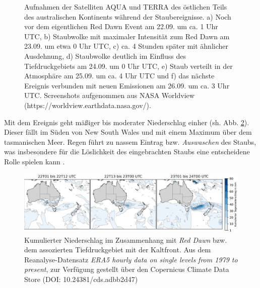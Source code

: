 \documentclass[12pt,a4paper,onecolumn,draft]{scrartcl}
\begin{document}
\begin{figure}[ht]
\begin{minipage}[c]{0.32\textwidth}
	\end{minipage}\hfill
\caption{Aufnahmen der Satelliten AQUA und TERRA des östlichen Teils des australischen Kontinents während der Staubereignisse. a) Noch vor dem eigentlichen Red Dawn Event am 22.09. um ca. 1 Uhr UTC, b) Staubwolke mit maximaler Intensität zum Red Dawn am 23.09. um etwa 0 Uhr UTC, c) ca. 4 Stunden später mit ähnlicher Ausdehnung, d) Staubwolke deutlich im Einfluss des Tiefdruckgebiets am 24.09. um 0 Uhr UTC, e) Staub verteilt in der Atmosphäre am 25.09. um ca. 4 Uhr UTC und f) das nächste Ereignis verbunden mit neuen Emissionen am 26.09. um ca. 3 Uhr UTC.  Screenshots aufgenommen aus NASA Worldview (https://worldview.earthdata.nasa.gov/).} \label{fig:satellite}
\end{figure}

Mit dem Ereignis geht mäßiger bis moderater Niederschlag einher (sh. Abb.  \ref{fig:rain}). Dieser fällt im Süden von New South Wales und mit einem Maximum über dem tasmanischen Meer. Regen führt zu nassem Eintrag bzw. \textit{Auswaschen} des Staubs, was insbesondere für die Löslichkeit des eingebrachten Staubs eine entscheidene Rolle spielen kann \citep{Gabric.2016}. 

\begin{figure}[ht]
\includegraphics[width=\textwidth]{bilder/reddawn/rain.png}
\caption{Kumulierter Niederschlag im Zusammenhang mit \textit{Red Dawn} bzw. dem assozierten Tiefdruckgebiet mit der Kaltfront. Aus dem Reanalyse-Datensatz \textit{ERA5 hourly data on single levels from 1979 to present}, zur Verfügung gestellt über den Copernicus Climate Data Store (DOI: 10.24381/cds.adbb2d47) } \label{fig:rain}
\end{figure}
\end{document}
